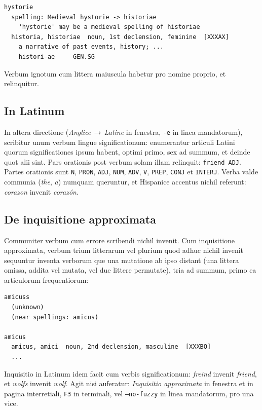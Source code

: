 \documentclass[12pt,
              article,
              oneside
              ]{memoir}
\newcommand*{\menu}[1]{\textit{#1}}
\newcommand*{\key}[1]{\texttt{#1}}
\begin{document}
\begin{verbatim}
hystorie
  spelling: Medieval hystorie -> historiae
    'hystorie' may be a medieval spelling of historiae
  historia, historiae  noun, 1st declension, feminine  [XXXAX]
    a narrative of past events, history; ...
    histori-ae     GEN.SG
\end{verbatim}

\noindent{}%
Verbum ignotum cum littera maiuscula habetur pro nomine proprio, et
relinquitur.

\subsection{In Latinum}

%
In altera directione (\menu{Anglice\,$\rightarrow$\,Latine} in fenestra,
\texttt{-e} in linea mandatorum), scribitur unum verbum lingue
significationum: enumerantur articuli Latini quorum significationes ipsum
habent, optimi primo, sex ad summum, et deinde quot alii sint. Pars
orationis post verbum solam illam relinquit: \texttt{friend ADJ}. Partes
orationis sunt \texttt{N}, \texttt{PRON}, \texttt{ADJ}, \texttt{NUM},
\texttt{ADV}, \texttt{V}, \texttt{PREP}, \texttt{CONJ} et
\texttt{INTERJ}. Verba valde communia (\textit{the}, \textit{a}) numquam
queruntur, et Hispanice accentus nichil referunt: \textit{corazon}
invenit \textit{corazón}.

\subsection{De inquisitione approximata}
\label{sec:fuzzy}

%
Communiter verbum cum errore scribendi nichil invenit. Cum inquisitione
approximata, verbum trium litterarum vel plurium quod adhuc nichil
invenit sequuntur inventa verborum que una mutatione ab ipso distant
(una littera omissa, addita vel mutata, vel due littere permutate), tria
ad summum, primo ea articulorum frequentiorum:

\begin{verbatim}
amicuss
  (unknown)
  (near spellings: amicus)

amicus
  amicus, amici  noun, 2nd declension, masculine  [XXXBO]
  ...
\end{verbatim}

\noindent
Inquisitio in Latinum idem facit cum verbis significationum:
\textit{freind} invenit \textit{friend}, et \textit{wolfs} invenit
\textit{wolf}. Agit nisi auferatur: \menu{Inquisitio approximata} in fenestra et in
pagina interretiali, \key{F3} in terminali, vel \texttt{--no-fuzzy} in
linea mandatorum, pro una vice.
\end{document}
